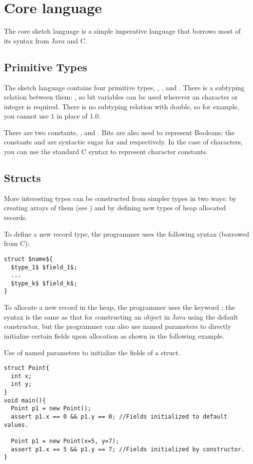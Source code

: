 \section{Core language}
The core sketch language is a simple imperative language that borrows most of its syntax from Java and C. 

\subsection{Primitive Types}
The sketch language contains four primitive types, , ,  and . There is a subtyping relation between them:
, so bit variables can be used wherever an character or integer is required. There is no subtyping relation with double, so for example, you cannot use $1$ in place of $1.0$. 

There are two  constants, , and . Bits are also used to represent Booleans; the constants  and  are syntactic sugar for  and  respectively. In the case of characters, you can use the standard C syntax to represent character constants. 

\subsection{Structs}
More interesting types can be constructed from simpler types in two ways: by creating arrays of them (see ) and by defining new types of heap allocated records. 

To define a new record type, the programmer uses the following syntax (borrowed from C):
\begin{lstlisting}
struct $name${
  $type_1$ $field_1$;
  ...
  $type_k$ $field_k$;
}
\end{lstlisting}

To allocate a new record in the heap, the programmer uses the keyword ; the syntax is the same as that for constructing an object in Java using the default constructor, but the programmer can also use named parameters to directly initialize certain fields upon allocation as shown in the following example.

\begin{Example}
Use of named parameters to initialize the fields of a struct. 	
\begin{lstlisting}
struct Point{
  int x;
  int y;
}
void main(){
  Point p1 = new Point();
  assert p1.x == 0 && p1.y == 0; //Fields initialized to default values.

  Point p1 = new Point(x=5, y=7);
  assert p1.x == 5 && p1.y == 7; //Fields initialized by constructor.
}
\end{lstlisting}
\end{Example}

